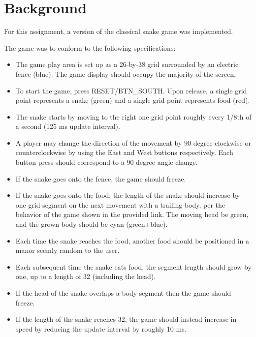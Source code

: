 \documentclass[paper=usletter, fontsize=12pt]{article}
\begin{document}
    \vspace{-0.1in}

    \section{Background}
    For this assignment, a version of the classical snake game was implemented.

    The game was to conform to the following specifications:

    \begin{itemize}

        \item The game play area is set up as a 26-by-38 grid surrounded by an electric fence (blue). The game display should occupy the majority of the screen.

        \item To start the game, press RESET/BTN\_SOUTH. Upon release, a single grid point represents a snake (green) and a single grid point represents food (red).

        \item The snake starts by moving to the right one grid point roughly every 1/8th of a second (125 ms update interval).

        \item A player may change the direction of the movement by 90 degree clockwise or counterclockwise by using the East and West buttons respectively. Each button press should correspond to a 90 degree angle change.

        \item If the snake goes onto the fence, the game should freeze.

        \item If the snake goes onto the food, the length of the snake should increase by one grid segment on the next movement with a trailing body, per the behavior of the game shown in the provided link. The moving head be green, and the grown body should be cyan (green+blue).

        \item Each time the snake reaches the food, another food should be positioned in a manor seemly random to the user.

        \item Each subsequent time the snake eats food, the segment length should grow by one, up to a length of 32 (including the head).

        \item If the head of the snake overlaps a body segment then the game should freeze.

        \item If the length of the snake reaches 32, the game should instead increase in speed by reducing the update interval by roughly 10 ms.

    \end{itemize}
\end{document}
